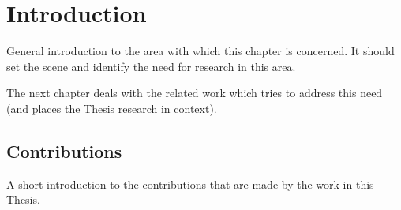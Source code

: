 \section{Introduction}
\label{sec:3-introduction}

General introduction to the area with which this chapter is concerned. It should set the scene and identify the need for research in this area.

The next chapter deals with the related work which tries to address this need (and places the Thesis research in context).

\subsection{Contributions}

A short introduction to the contributions that are made by the work in this Thesis.